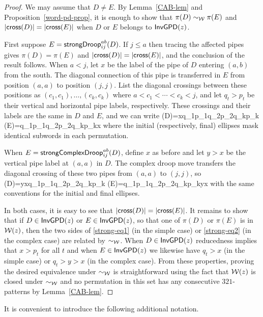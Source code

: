 \documentclass[10pt]{article}
\begin{document}
\begin{proof}
 We may assume that $D\neq E$. 
 By Lemma~\ref{CAB-lem} and Proposition~\ref{word-pd-prop},
 it is enough to show that 
 $
\pi(D)\sim_{\mathcal{W}}\pi(E)
$ and 
$|\mathsf{cross}(D)|=|\mathsf{cross}(E)|$ when $D$ or $E$ belongs to  $\mathsf{InvGPD}(z)$.
 



First suppose $E = \mathsf{strongDroop}^{ab}_{ij}(D)$. If $j\leq a$
then tracing the affected pipes gives
$
\pi(D)=\pi(E)
$ and 
$|\mathsf{cross}(D)|=|\mathsf{cross}(E)|$, and the conclusion of  the result follows.
%
When $a<j$, let $x$ be the label of the pipe of $D$ entering $(a,b)$ from the south. 
The diagonal connection of this pipe is transferred in $E$ from position 
$(a,a)$ to position $(j,j)$.
List the diagonal crossings between these positions as
$
(c_1,c_1),\ldots,(c_k,c_k)$ where $ a<c_1<\cdots<c_k<j$,
and let $q_t>p_t$ be their vertical and horizontal pipe labels, respectively. These crossings and their labels are the same in $D$ and $E$, and we can write
\be\label{strong-eq1}
\pi(D)=\cdots xq_1p_1q_2p_2\cdots q_kp_k\cdots 
\qquand
\pi(E)=\cdots q_1p_1q_2p_2\cdots q_kp_kx\cdots 
\ee
where the initial (respectively, final) ellipses mask identical subwords in each permutation.

When $E = \mathsf{strongComplexDroop}^{ab}_{ij}(D)$, define $x$ as before and let $y>x$ be the vertical pipe label at $(a,a)$ in $D$. The complex droop move transfers the diagonal crossing of these two pipes from $(a,a)$ to $(j,j)$, so 
\be\label{strong-eq2}
\pi(D)=\cdots yxq_1p_1q_2p_2\cdots q_kp_k\cdots 
\qquand
\pi(E)=\cdots q_1p_1q_2p_2\cdots q_kp_kyx\cdots
\ee
with the same conventions for the initial and final ellipses.

In both cases, it is easy to see that 
$|\mathsf{cross}(D)|=|\mathsf{cross}(E)|$.
It remains to show that if $D\in\mathsf{InvGPD}(z)$ or $E \in \mathsf{InvGPD}(z)$,
so that one of $\pi(D)$ or $\pi(E)$ is in $\mathcal{W}(z)$,
then the two sides of \eqref{strong-eq1} (in the simple case) or \eqref{strong-eq2} (in the complex case)
are related by $\sim_{\mathcal{W}}$. 
When $D \in \mathsf{InvGPD}(z)$ reducedness implies that $x>p_t$ for all $t$ and when $E \in \mathsf{InvGPD}(z)$ we likewise have $q_t>x$ (in the simple case) or $q_t>y>x$ (in the complex case).
From these properties, proving the desired equivalence under $\sim_{\mathcal{W}}$ is 
straightforward
using the fact that $\mathcal{W}(z)$ is closed under  $\sim_{\mathcal{W}}$
and no permutation in this set has any consecutive $321$-patterns by Lemma~\ref{CAB-lem}.
\end{proof}


It is convenient to introduce the following additional notation.
\end{document}
